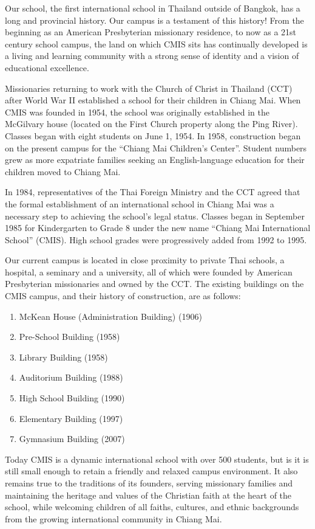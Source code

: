 Our school, the first international school in Thailand outside of Bangkok, has a long and provincial history.  Our campus is a testament of this history!  From the beginning as an American Presbyterian missionary residence, to now as a 21st century school campus, the land on which CMIS sits has continually developed is a living and learning community with a strong sense of identity and a vision of educational excellence.  


Missionaries returning to work with the Church of Christ in Thailand (CCT) after World War II established a school for their children in Chiang Mai.  When CMIS was founded in 1954, the school was originally established in the McGilvary house (located on the First Church property along the Ping River).  Classes began with eight students on June 1, 1954.  In 1958, construction began on the present campus for the “Chiang Mai Children’s Center”.   Student numbers grew as more expatriate families seeking an English-language education for their children moved to Chiang Mai.

In 1984, representatives of the Thai Foreign Ministry and the CCT agreed that the formal establishment of an international school in Chiang Mai was a necessary step to achieving the school’s legal status.  Classes began in September 1985 for Kindergarten to Grade 8 under the new name “Chiang Mai International School” (CMIS).  High school grades were progressively added from 1992 to 1995.  

Our current campus is located in close proximity to private Thai schools, a hospital, a seminary and a university, all of which were founded by American Presbyterian missionaries and owned by the CCT.  The existing buildings on the CMIS campus, and their history of construction, are as follows: 
\begin{enumerate}
\item McKean House (Administration Building) (1906)
\item Pre-School Building (1958)
\item Library Building (1958)
\item Auditorium Building (1988)
\item High School Building (1990)
\item Elementary Building (1997)
\item Gymnasium Building (2007)
\end{enumerate}
Today CMIS is a dynamic international school with over 500 students, but is it is still small enough to retain a friendly and relaxed campus environment.  It also remains true to the traditions of its founders, serving missionary families and maintaining the heritage and values of the Christian faith at the heart of the school, while welcoming children of all faiths, cultures, and ethnic backgrounds from the growing international community in Chiang Mai.  

